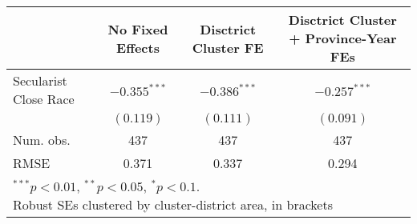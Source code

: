 
\begin{tabular}{l c c c }
\hline
 & No Fixed Effects & Disctrict Cluster FE & Disctrict Cluster + Province-Year FEs \\
\hline
Secularist Close Race & $-0.355^{***}$ & $-0.386^{***}$ & $-0.257^{***}$ \\
                      & $(0.119)$      & $(0.111)$      & $(0.091)$      \\
\hline
Num. obs.             & 437            & 437            & 437            \\
RMSE                  & 0.371          & 0.337          & 0.294          \\
\hline
\multicolumn{4}{l}{\scriptsize{\parbox{.4\linewidth}{\vspace{2pt}$^{***}p<0.01$, $^{**}p<0.05$, $^*p<0.1$. \\
       Robust SEs clustered by cluster-district area, in brackets}}}
\end{tabular}
